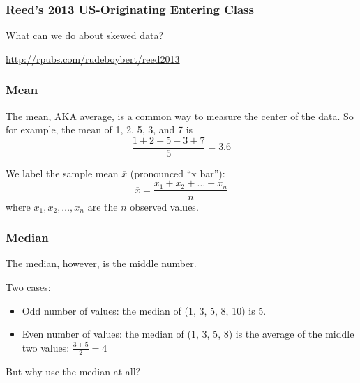 \documentclass[handout]{beamer}
\newcommand{\blue}[1]{\textcolor{blue2}{#1}}
\begin{document}
\begin{frame}
\frametitle{Reed's 2013 US-Originating Entering Class}
What can we do about skewed data?  

\vspace{1cm}

\blue{\url{http://rpubs.com/rudeboybert/reed2013}}

\end{frame}


\begin{frame}[fragile]
\frametitle{Mean}
The mean, AKA average, is a common way to measure the \blue{center} of the data.  So for example, the mean of 1, 2, 5, 3, and 7 is 
\[\frac{1 + 2 + 5 + 3 + 7}{5} = 3.6\]

\pause We label the \blue{sample mean} $\overline{x}$ (pronounced ``x bar''):
\[
\overline{x} = \frac{x_1 + x_2 + \ldots + x_n}{n}
\]
where $x_1, x_2, \ldots, x_n$ are the $n$ observed values.  
\end{frame}


\begin{frame}[fragile]
\frametitle{Median}
The \blue{median}, however, is the \blue{middle number}.

\vspace{0.5cm}

\pause Two cases:
\begin{itemize}
\item Odd number of values: the median of (1, 3, \blue{5}, 8, 10) is 5.
\item Even number of values: the median of (1, \blue{3, 5}, 8) is the average of the middle two values: $\frac{3+5}{2} = 4$
\end{itemize}

\vspace{0.5cm}

\pause But why use the median at all?

\end{frame}
\end{document}
